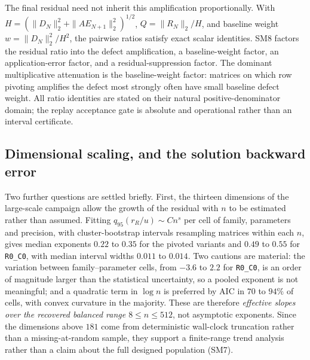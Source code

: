 \documentclass[review,onefignum,onetabnum]{siamart251216}
\begin{document}
The final residual need not inherit this amplification proportionally.  With
$H=(\|D_N\|_2^2+\|AE_{N+1}\|_2^2)^{1/2}$, $Q=\|R_N\|_2/H$, and baseline weight
$w=\|D_N\|_2^2/H^2$, the pairwise ratios satisfy exact scalar identities.  SM8 factors the residual
ratio into the defect amplification, a baseline-weight factor, an application-error factor, and a
residual-suppression factor.  The dominant multiplicative attenuation is the baseline-weight factor:
matrices on which row pivoting amplifies the defect most strongly often have small baseline defect
weight.  All ratio identities are stated on their natural positive-denominator domain; the replay
acceptance gate is absolute and operational rather than an interval certificate.

\subsection{Dimensional scaling, and the solution backward error}
\label{sec:scaling}

Two further questions are settled briefly. First, the thirteen dimensions of the large-scale
campaign allow the growth of the residual with $n$ to be estimated rather than assumed. Fitting
$q_{95}(r_R/u)\sim Cn^{s}$ per cell of family, parameters and precision, with cluster-bootstrap
intervals resampling matrices within each $n$, gives median exponents $0.22$ to $0.35$ for the
pivoted variants and $0.49$ to $0.55$ for \texttt{R0\_C0}, with median interval widths $0.011$ to
$0.014$. Two cautions are material: the variation between family--parameter cells, from $-3.6$ to $2.2$
for \texttt{R0\_C0}, is an order of magnitude larger than the statistical uncertainty, so a pooled
exponent is not meaningful; and a quadratic term in $\log n$ is preferred by AIC in $70$ to
$94\%$ of cells, with convex curvature in the majority. These are therefore \emph{effective slopes
over the recovered balanced range $8\le n\le512$}, not asymptotic exponents. Since the dimensions
above $181$ come from deterministic wall-clock truncation rather than a missing-at-random sample,
they support a finite-range trend analysis rather than a claim about the full designed population
(SM7).
\end{document}

